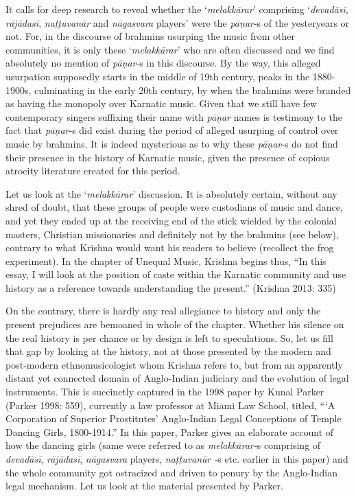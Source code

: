 It calls for deep research to reveal whether the ‘\textit{melakkārar}’ comprising ‘\textit{devadāsī}, \textit{rājādasī}, \textit{naṭṭuvanār} and \textit{nāgasvara} players’ were the \textit{pāṇar}-s of the yesteryears or not. For, in the discourse of brahmins usurping the music from other communities, it is only these ‘\textit{melakkārar}’ who are often discussed and we find absolutely no mention of \textit{pāṇar}-s in this discourse. By the way, this alleged usurpation supposedly starts in the middle of 19th century, peaks in the 1880-1900s, culminating in the early 20th century, by when the brahmins were branded as having the monopoly over Karnatic music. Given that we still have few contemporary singers suffixing their name with \textit{pāṇar} names is testimony to the fact that \textit{pāṇar}-s did exist during the period of alleged usurping of control over music by brahmins. It is indeed mysterious as to why these \textit{pāṇar}-s do not find their presence in the history of Karnatic music, given the presence of copious atrocity literature created for this period.

Let us look at the ‘\textit{melakkārar}’ discussion. It is absolutely certain, without any shred of doubt, that these groups of people were custodians of music and dance, and yet they ended up at the receiving end of the stick wielded by the colonial masters, Christian missionaries and definitely not by the brahmins (see below), contrary to what Krishna would want his readers to believe (recollect the frog experiment). In the chapter of Unequal Music, Krishna begins thus, “In this essay, I will look at the position of caste within the Karnatic community and use history as a reference towards understanding the present.” (Krishna 2013: 335)

On the contrary, there is hardly any real allegiance to history and only the present prejudices are bemoaned in whole of the chapter. Whether his silence on the real history is per chance or by design is left to speculations. So, let us fill that gap by looking at the history, not at those presented by the modern and post-modern ethnomusicologist whom Krishna refers to, but from an apparently distant yet connected domain of Anglo-Indian judiciary and the evolution of legal instruments. This is succinctly captured in the 1998 paper by Kunal Parker (Parker 1998: 559), currently a law professor at Miami Law School, titled, “‘A Corporation of Superior Prostitutes’ Anglo-Indian Legal Conceptions of Temple Dancing Girls, 1800-1914.” In this paper, Parker gives an elaborate account of how the dancing girls (same were referred to as \textit{melakkārar-}s comprising of \textit{devadāsī}, \textit{rājādasī}, \textit{nāgasvara} players, \textit{naṭṭuvanār -}s etc. earlier in this paper) and the whole community got ostracized and driven to penury by the Anglo-Indian legal mechanism. Let us look at the material presented by Parker.

